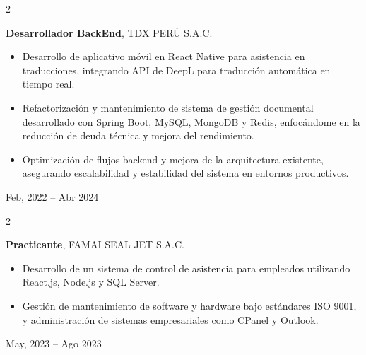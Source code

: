 \documentclass[10pt, letterpaper]{article}
\newenvironment{highlights}{
    \begin{itemize}[
        topsep=0.10 cm,
        parsep=0.10 cm,
        partopsep=0pt,
        itemsep=0pt,
        leftmargin=0 cm + 10pt
    ]
}{
    \end{itemize}
} %
\newenvironment{twocolentry}[2][]{
    \onecolentry
    \def\secondColumn{#2}
    \setcolumnwidth{\fill, 4.5 cm}
    \begin{paracol}{2}
}{
    \switchcolumn \raggedleft \secondColumn
    \end{paracol}
    \endonecolentry
} %
\begin{document}
        \vspace{0.3 cm}


        \begin{twocolentry}{
            Feb, 2022 – Abr 2024
        }
            \textbf{Desarrollador BackEnd}, TDX PERÚ S.A.C.

        \vspace{0.10 cm}
            \begin{highlights}
                \vspace{0.1 cm}
                \item Desarrollo de aplicativo móvil en React Native para asistencia en traducciones, integrando API de DeepL para traducción automática en tiempo real.
                \item Refactorización y mantenimiento de sistema de gestión documental desarrollado con Spring Boot, MySQL, MongoDB y Redis, enfocándome en la reducción de deuda técnica y mejora del rendimiento.
                \item Optimización de flujos backend y mejora de la arquitectura existente, asegurando escalabilidad y estabilidad del sistema en entornos productivos.
            \end{highlights}
            \end{twocolentry}


        \vspace{0.3 cm}


        \begin{twocolentry}{
            May, 2023 – Ago 2023
        }
            \textbf{Practicante}, FAMAI SEAL JET S.A.C.

        \vspace{0.10 cm}
            \begin{highlights}
                \vspace{0.1 cm}
                \item Desarrollo de un sistema de control de asistencia para empleados utilizando React.js, Node.js y SQL Server.
                \item Gestión de mantenimiento de software y hardware bajo estándares ISO 9001, y administración de sistemas empresariales como CPanel y Outlook.
            \end{highlights}
        \end{twocolentry}

    
\end{document}

